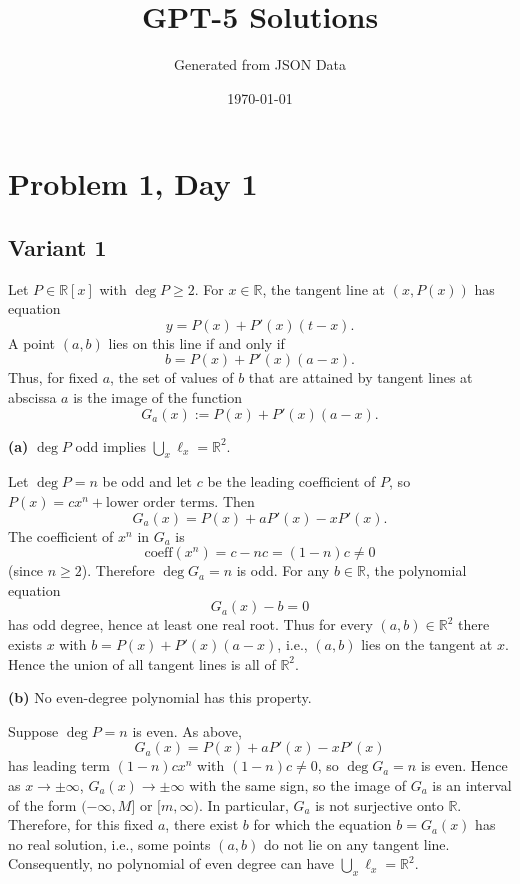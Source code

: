 \documentclass[12pt,a4paper]{article}
\title{GPT-5 Solutions}
\author{Generated from JSON Data}
\date{\today}
\theoremstyle{definition}
\begin{document}
    \maketitle
    \tableofcontents
    \newpage

    \section{Problem 1, Day 1}
    \subsection{Variant 1}
    Let $P \in \mathbb{R}[x]$ with $\deg P \geq 2$. For $x \in \mathbb{R}$, the tangent line at $(x, P(x))$ has equation
    $$y = P(x) + P'(x)(t - x).$$
    A point $(a, b)$ lies on this line if and only if
    $$b = P(x) + P'(x)(a - x).$$
    Thus, for fixed $a$, the set of values of $b$ that are attained by tangent lines at abscissa $a$ is the image of the function
    $$G_a(x) := P(x) + P'(x)(a - x).$$

    \textbf{(a)} $\deg P$ odd implies $\bigcup_x \ell_x = \mathbb{R}^2$.

    Let $\deg P = n$ be odd and let $c$ be the leading coefficient of $P$, so $P(x) = cx^n + \text{lower order terms}$. Then
    $$G_a(x) = P(x) + aP'(x) - xP'(x).$$
    The coefficient of $x^n$ in $G_a$ is
    $$\text{coeff}(x^n) = c - nc = (1-n)c \neq 0$$
    (since $n \geq 2$). Therefore $\deg G_a = n$ is odd. For any $b \in \mathbb{R}$, the polynomial equation
    $$G_a(x) - b = 0$$
    has odd degree, hence at least one real root. Thus for every $(a,b) \in \mathbb{R}^2$ there exists $x$ with $b = P(x) + P'(x)(a-x)$, i.e., $(a,b)$ lies on the tangent at $x$. Hence the union of all tangent lines is all of $\mathbb{R}^2$.

    \textbf{(b)} No even-degree polynomial has this property.

    Suppose $\deg P = n$ is even. As above,
    $$G_a(x) = P(x) + aP'(x) - xP'(x)$$
    has leading term $(1-n)cx^n$ with $(1-n)c \neq 0$, so $\deg G_a = n$ is even. Hence as $x \to \pm\infty$, $G_a(x) \to \pm\infty$ with the same sign, so the image of $G_a$ is an interval of the form $(-\infty, M]$ or $[m, \infty)$. In particular, $G_a$ is not surjective onto $\mathbb{R}$. Therefore, for this fixed $a$, there exist $b$ for which the equation $b = G_a(x)$ has no real solution, i.e., some points $(a,b)$ do not lie on any tangent line. Consequently, no polynomial of even degree can have $\bigcup_x \ell_x = \mathbb{R}^2$.
\end{document}
